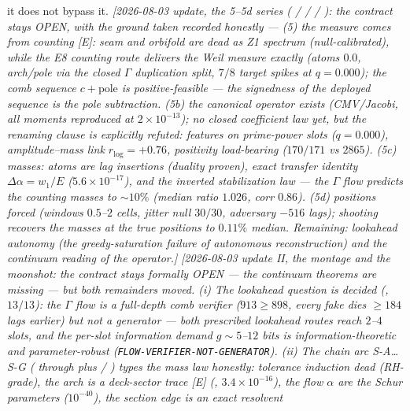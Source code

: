it does not bypass it.  \emph{[2026-08-03 update, the 5--5d series
( /
 /  /
): the contract stays OPEN, with
the ground taken recorded honestly --- (5) the \emph{measure} comes
from counting [E]: seam and orbifold are dead as Z1 spectrum
(null-calibrated), while the E8 counting route delivers the Weil
measure exactly (atoms $0.0$, arch/pole via the closed $\Gamma$
duplication split, $7/8$ target spikes at $q=0.000$); the comb
sequence $c+\mathrm{pole}$ is positive-feasible --- the signedness of
the deployed sequence \emph{is} the pole subtraction.  (5b) the
canonical operator \emph{exists} (CMV/Jacobi, all moments reproduced
at $2\times10^{-13}$); no closed coefficient law yet, but the
renaming clause is explicitly refuted: features on prime-power slots
($q=0.000$), amplitude--mass link $r_{\log}=+0.76$, positivity
load-bearing ($170/171$ vs $2865$).  (5c) masses: atoms are
lag insertions (duality proven), exact transfer identity
$\Delta\alpha=w_1/E$ ($5.6\times10^{-17}$), and the \emph{inverted}
stabilization law --- the $\Gamma$ flow predicts the counting masses
to ${\sim}10\%$ (median ratio $1.026$, corr $0.86$).  (5d) positions
\emph{forced} (windows $0.5$--$2$ cells, jitter null $30/30$,
adversary $-516$ lags); shooting recovers the masses at the true
positions to $0.11\%$ median.  \emph{Remaining:} lookahead autonomy
(the greedy-saturation failure of autonomous reconstruction) and the
continuum reading of the operator.]}  \emph{[2026-08-03 update II,
the montage and the moonshot: the contract stays \emph{formally
OPEN} --- the continuum \emph{theorems} are missing --- but both
remainders moved.  (i) The lookahead question is \emph{decided}
(, $13/13$): the $\Gamma$ flow is a
full-depth comb \emph{verifier} ($913\ge898$, every fake dies
$\ge184$ lags earlier) but \emph{not} a generator --- both prescribed
lookahead routes reach $2$--$4$ slots, and the per-slot information
demand $g\sim5$--$12$ bits is information-theoretic and
parameter-robust (\texttt{FLOW-VERIFIER-NOT-GENERATOR}).  (ii) The
chain arc S-A\ldots S-G (
through  plus
 /
) types the mass law
honestly: tolerance induction dead (RH-grade), the arch is a
deck-sector trace [E] (,
$3.4\times10^{-16}$), the flow $\alpha$ \emph{are} the Schur
parameters ($10^{-40}$), the section edge is an exact resolvent
}
